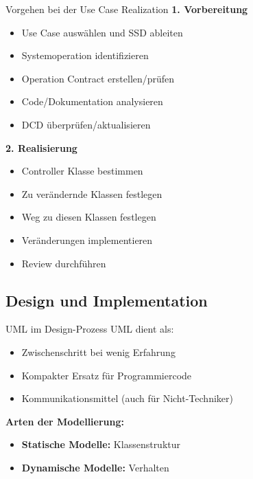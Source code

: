\begin{KR}{Vorgehen bei der Use Case Realization}
\textbf{1. Vorbereitung}
\begin{itemize}
    \item Use Case auswählen und SSD ableiten
    \item Systemoperation identifizieren
    \item Operation Contract erstellen/prüfen
    \item Code/Dokumentation analysieren
    \item DCD überprüfen/aktualisieren
\end{itemize}

\textbf{2. Realisierung}
\begin{itemize}
    \item Controller Klasse bestimmen
    \item Zu verändernde Klassen festlegen
    \item Weg zu diesen Klassen festlegen
    \item Veränderungen implementieren
    \item Review durchführen
\end{itemize}
\end{KR}

\subsection{Design und Implementation}

\begin{concept}{UML im Design-Prozess}
UML dient als:
\begin{itemize}
    \item Zwischenschritt bei wenig Erfahrung
    \item Kompakter Ersatz für Programmiercode
    \item Kommunikationsmittel (auch für Nicht-Techniker)
\end{itemize}

\textbf{Arten der Modellierung:}
\begin{itemize}
    \item \textbf{Statische Modelle:} Klassenstruktur
    \item \textbf{Dynamische Modelle:} Verhalten
\end{itemize}
\end{concept}

